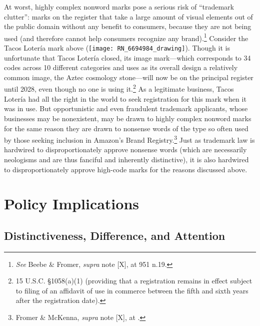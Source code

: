 \documentclass[letterpaper, 11pt, oneside]{article}
\begin{document}
At worst, highly complex nonword marks pose a serious risk of ``trademark clutter'': marks on the register that take a large amount of visual elements out of the public domain without any benefit to consumers, because they are not being used (and therefore cannot help consumers recognize any brand).\footnote{\textit{See} Beebe \& Fromer, \textit{supra} note [X], at 951 n.19.} Consider the Tacos Lotería mark above (\texttt{[image: RN\_6694984\_drawing]}). Though it is unfortunate that Tacos Lotería closed, its image mark—which corresponds to 34 codes across 10 different categories and uses as its overall design a relatively common image, the Aztec cosmology stone—will now be on the principal register until 2028, even though no one is using it.\footnote{15 U.S.C. \S 1058(a)(1) (providing that a registration remains in effect subject to filing of an affidavit of use in commerce between the fifth and sixth years after the registration date).} As a legitimate business, Tacos Lotería had all the right in the world to seek registration for this mark when it was in use. But opportunistic and even fraudulent trademark applicants, whose businesses may be nonexistent, may be drawn to highly complex nonword marks for the same reason they are drawn to nonsense words of the type so often used by those seeking inclusion in Amazon's Brand Registry.\footnote{Fromer \& McKenna, \textit{supra} note [X], at .} Just as trademark law is hardwired to disproportionately approve nonsense words (which are necessarily neologisms and are thus fanciful and inherently distinctive), it is also hardwired to disproportionately approve high-code marks for the reasons discussed above.

\section{Policy Implications} \label{sec:3}

\subsection{Distinctiveness, Difference, and Attention}\label{subsec:3A}
\end{document}
